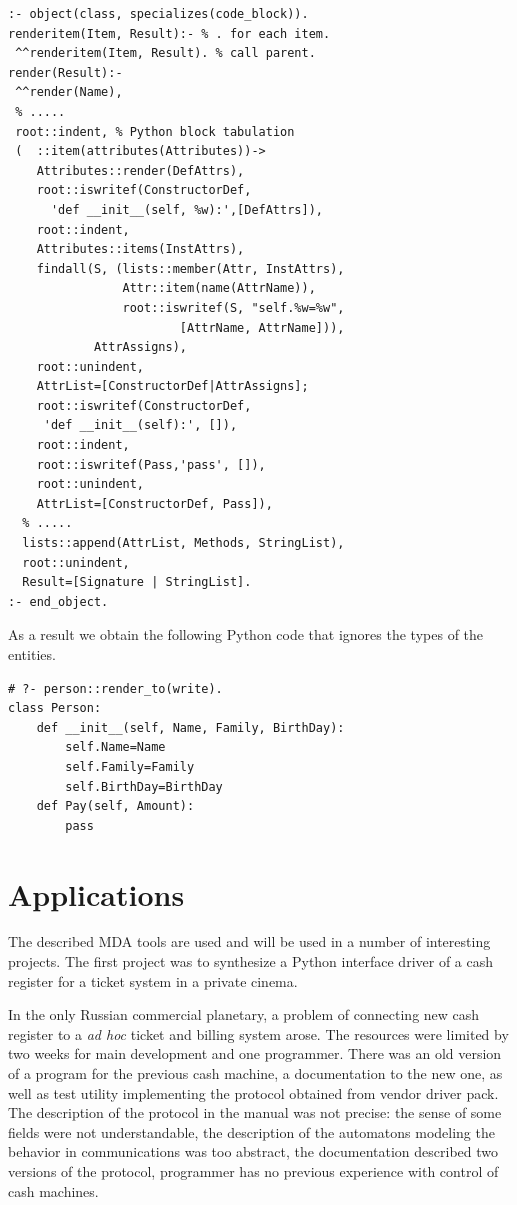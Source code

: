 \documentclass[runningheads]{llncs}
\begin{document}
\begin{verbatim}
:- object(class, specializes(code_block)).
renderitem(Item, Result):- % . for each item.
 ^^renderitem(Item, Result). % call parent.
render(Result):-
 ^^render(Name),
 % .....
 root::indent, % Python block tabulation
 (  ::item(attributes(Attributes))->
    Attributes::render(DefAttrs),
    root::iswritef(ConstructorDef,
      'def __init__(self, %w):',[DefAttrs]),
    root::indent,
    Attributes::items(InstAttrs),
    findall(S, (lists::member(Attr, InstAttrs),
                Attr::item(name(AttrName)),
                root::iswritef(S, "self.%w=%w",
                        [AttrName, AttrName])),
            AttrAssigns),
    root::unindent,
    AttrList=[ConstructorDef|AttrAssigns];
    root::iswritef(ConstructorDef,
     'def __init__(self):', []),
    root::indent,
    root::iswritef(Pass,'pass', []),
    root::unindent,
    AttrList=[ConstructorDef, Pass]),
  % .....
  lists::append(AttrList, Methods, StringList),
  root::unindent,
  Result=[Signature | StringList].
:- end_object.
\end{verbatim}

As a result we obtain the following Python code that ignores the types of the entities.
\begin{verbatim}
# ?- person::render_to(write).
class Person:
    def __init__(self, Name, Family, BirthDay):
        self.Name=Name
        self.Family=Family
        self.BirthDay=BirthDay
    def Pay(self, Amount):
        pass
\end{verbatim}

\section{Applications}
\label{sec:app}

The described MDA tools are used and will be used in a number of interesting projects.  The first project was to synthesize a Python interface driver of a cash register for a ticket system in a private cinema.

In the only Russian commercial planetary, a problem of connecting new cash register to a \emph{ad hoc} ticket and billing system arose.  The resources were limited by two weeks for main development and one programmer.  There was an old version of a program for the previous cash machine, a documentation to the new one, as well as test utility implementing the protocol obtained from vendor driver pack.  The description of the protocol in the manual was not precise: the sense of some fields were not understandable, the description of the automatons modeling the behavior in communications was too abstract, the documentation described two versions of the protocol, programmer has no previous experience with control of cash machines.
\end{document}

